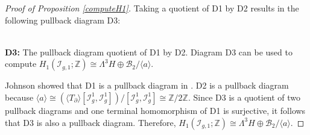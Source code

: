 \documentclass[a4paper]{amsproc}
\theoremstyle{TheoremNum}
\theoremstyle{Theorembold}
\theoremstyle{TheoremboldDef}
\theoremstyle{TheoremboldRem}
\theoremstyle{TheoremboldRem}
\begin{document}
\begin{proof}[Proof of Proposition \ref{computeH1}]
Taking a quotient of D1 by D2 results in the following pullback diagram D3:\\

\begin{center}
\\
\textbf{D3:} The pullback diagram quotient of D1 by D2. Diagram D3 can be used to compute $H_1({{\mathcal{I}}_{g,1}};{\mathbb{Z}})\cong\Lambda^3H\oplus \mathcal{B}_2/\langle a \rangle$.\\
\end{center}

 Johnson showed that D1 is a pullback diagram in \cite{johnsonstructure3}. D2 is a pullback diagram because $\langle a \rangle \cong (\langle T_\partial\rangle[{{\mathcal{I}}_{g}^{1}},{{\mathcal{I}}_{g}^{1}}])/[{{\mathcal{I}}_{g}^{1}},{{\mathcal{I}}_{g}^{1}}]\cong {\mathbb{Z}}/2{\mathbb{Z}}$. Since D3 is a quotient of two pullback diagrams and one terminal homomorphism of D1 is surjective, it follows that D3 is also a pullback diagram. Therefore, $H_1({{\mathcal{I}}_{g,1}};{\mathbb{Z}})\cong \Lambda^3H\oplus \mathcal{B}_2/\langle a\rangle$.\end{proof}
 
\end{document}
